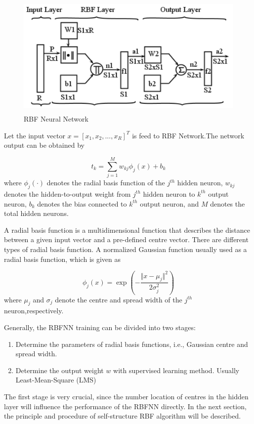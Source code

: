 \documentclass[12pt,a4paper,oneside]{article}
\numberwithin{equation}{section}
\numberwithin{algorithm}{section}
\begin{document}
	\begin{figure}[hbtp]
	\centering
	\includegraphics[width=350pt,height=170pt]{figures/RBF}
	\caption{RBF Neural Network}
	\label{figure_rbf}
	\end{figure}
	Let the input vector $x=[x_1,x_2,...,x_R]^T$ is feed to RBF Network.The network output can be obtained by
	
	\begin{equation}\label{equation_rbf_network_output}
	t_k=\sum\limits_{j=1}^{M}w_{kj}\phi_j(x)+b_k
	\end{equation}
	where $\phi_j(\cdot)$ denotes the radial basis function of the $j^{th}$ hidden neuron, $w_{kj}$ denotes the hidden-to-output weight from $j^{th}$ hidden neuron to $k^{th}$ output neuron, $b_k$ denotes the bias connected to $k^{th}$ output neuron, and $M$ denotes the total hidden neurons.
	
	A radial basis function is a multidimensional function that describes the distance between a given input vector and a pre-defined centre vector. There are different types of radial basis function.  A normalized Gaussian function usually used as a radial basis function, which is given as
	
	\begin{equation}\label{equation_radial_basis_fuction}
	\phi_j(x)=\exp(-\frac{\Vert x-\mu_j\Vert^2}{2\sigma^2_j})
	\end{equation}
	where $\mu_j$ and $\sigma_j$ denote the centre and spread width of the $j^{th}$ neuron,respectively.
	
	Generally, the RBFNN training can be divided into two stages:
	\begin{enumerate}
	\item Determine the parameters of radial basis functions, i.e., Gaussian centre and spread width.
	\item Determine the output weight $w$ with supervised learning method. Usually Least-Mean-Square (LMS)
	\end{enumerate}
	The first stage is very crucial, since the number location of centres in the hidden layer will influence the performance of the RBFNN directly. In the next section, the principle and procedure of self-structure RBF algorithm will be described.
	
\end{document}

